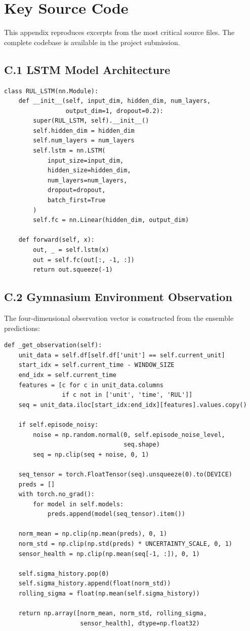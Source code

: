 \documentclass[12pt,a4paper]{report}
\begin{document}
\chapter{Key Source Code}
\label{app:source_code}

This appendix reproduces excerpts from the most critical source files. The complete codebase is available in the project submission.

\section*{C.1 LSTM Model Architecture}

\begin{verbatim}
class RUL_LSTM(nn.Module):
    def __init__(self, input_dim, hidden_dim, num_layers,
                 output_dim=1, dropout=0.2):
        super(RUL_LSTM, self).__init__()
        self.hidden_dim = hidden_dim
        self.num_layers = num_layers
        self.lstm = nn.LSTM(
            input_size=input_dim,
            hidden_size=hidden_dim,
            num_layers=num_layers,
            dropout=dropout,
            batch_first=True
        )
        self.fc = nn.Linear(hidden_dim, output_dim)

    def forward(self, x):
        out, _ = self.lstm(x)
        out = self.fc(out[:, -1, :])
        return out.squeeze(-1)
\end{verbatim}

\section*{C.2 Gymnasium Environment Observation}

The four-dimensional observation vector is constructed from the ensemble predictions:

\begin{verbatim}
def _get_observation(self):
    unit_data = self.df[self.df['unit'] == self.current_unit]
    start_idx = self.current_time - WINDOW_SIZE
    end_idx = self.current_time
    features = [c for c in unit_data.columns
                if c not in ['unit', 'time', 'RUL']]
    seq = unit_data.iloc[start_idx:end_idx][features].values.copy()

    if self.episode_noisy:
        noise = np.random.normal(0, self.episode_noise_level,
                                 seq.shape)
        seq = np.clip(seq + noise, 0, 1)

    seq_tensor = torch.FloatTensor(seq).unsqueeze(0).to(DEVICE)
    preds = []
    with torch.no_grad():
        for model in self.models:
            preds.append(model(seq_tensor).item())

    norm_mean = np.clip(np.mean(preds), 0, 1)
    norm_std = np.clip(np.std(preds) * UNCERTAINTY_SCALE, 0, 1)
    sensor_health = np.clip(np.mean(seq[-1, :]), 0, 1)

    self.sigma_history.pop(0)
    self.sigma_history.append(float(norm_std))
    rolling_sigma = float(np.mean(self.sigma_history))

    return np.array([norm_mean, norm_std, rolling_sigma,
                     sensor_health], dtype=np.float32)
\end{verbatim}
\end{document}
